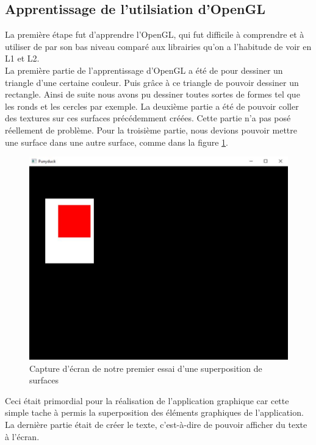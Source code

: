 \documentclass{report}
\begin{document}
\subsection{Apprentissage de l'utilsiation d'OpenGL}
La première étape fut d'apprendre l'OpenGL, qui fut difficile à comprendre et à utiliser de par son bas niveau comparé aux librairies qu'on a l'habitude de voir en L1 et L2. \\
La première partie de l'apprentissage d'OpenGL a été de pour dessiner un triangle d'une certaine couleur. Puis grâce à ce triangle de pouvoir dessiner un rectangle. Ainsi de suite nous avons pu dessiner toutes sortes de formes tel que les ronds et les cercles par exemple.
La deuxième partie a été de pouvoir coller des textures sur ces surfaces précédemment créées. Cette partie n'a pas posé réellement de problème.
Pour la troisième partie, nous devions pouvoir mettre une surface dans une autre surface, comme dans la figure \ref{exsurface}.
\begin{figure}
    \begin{center}
        \includegraphics[scale=0.3]{exempleSurface.jpg}
        \caption{Capture d'écran de notre premier essai d'une superposition de surfaces}
        \label{exsurface}
    \end{center}
\end{figure}
Ceci était primordial pour la réalisation de l'application graphique car cette simple tache à permis la superposition des éléments graphiques de l'application. \\
La dernière partie était de créer le texte, c'est-à-dire de pouvoir afficher du texte à l'écran. \\
\end{document}
